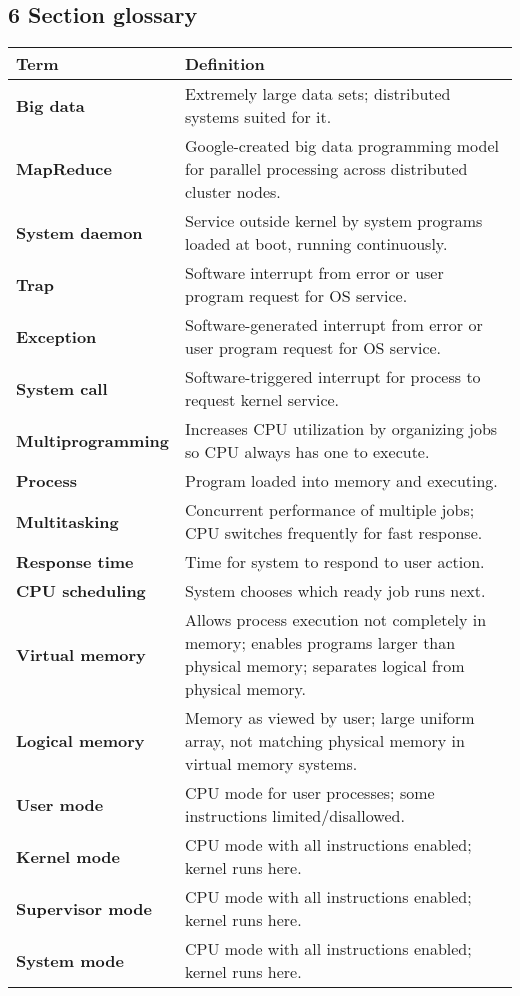 \documentclass{article}
\begin{document}
\subsection*{6 Section glossary}
\centering
\begin{tabular}{>{\raggedright}p{} >{\raggedright\arraybackslash}p{}}
\toprule
\textbf{Term} & \textbf{Definition} \\
\midrule
\textbf{Big data} & Extremely large data sets; distributed systems suited for it. \\
\textbf{MapReduce} & Google-created big data programming model for parallel processing across distributed cluster nodes. \\
\textbf{System daemon} & Service outside kernel by system programs loaded at boot, running continuously. \\
\textbf{Trap} & Software interrupt from error or user program request for OS service. \\
\textbf{Exception} & Software-generated interrupt from error or user program request for OS service. \\
\textbf{System call} & Software-triggered interrupt for process to request kernel service. \\
\textbf{Multiprogramming} & Increases CPU utilization by organizing jobs so CPU always has one to execute. \\
\textbf{Process} & Program loaded into memory and executing. \\
\textbf{Multitasking} & Concurrent performance of multiple jobs; CPU switches frequently for fast response. \\
\textbf{Response time} & Time for system to respond to user action. \\
\textbf{CPU scheduling} & System chooses which ready job runs next. \\
\textbf{Virtual memory} & Allows process execution not completely in memory; enables programs larger than physical memory; separates logical from physical memory. \\
\textbf{Logical memory} & Memory as viewed by user; large uniform array, not matching physical memory in virtual memory systems. \\
\textbf{User mode} & CPU mode for user processes; some instructions limited/disallowed. \\
\textbf{Kernel mode} & CPU mode with all instructions enabled; kernel runs here. \\
\textbf{Supervisor mode} & CPU mode with all instructions enabled; kernel runs here. \\
\textbf{System mode} & CPU mode with all instructions enabled; kernel runs here. \\
\bottomrule
\end{tabular}
\vspace{\baselineskip}
\end{document}
